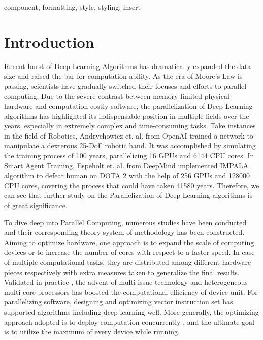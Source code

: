 \documentclass[conference]{IEEEtran}
\begin{document}
\begin{IEEEkeywords}
component, formatting, style, styling, insert
\end{IEEEkeywords}

\section{Introduction}

Recent burst of Deep Learning Algorithms has dramatically expanded the data size and raised the bar for computation ability. As the era of Moore’s Law is passing, scientists have gradually switched their focuses and efforts to parallel computing. Due to the severe contrast between memory-limited physical hardware and computation-costly software, the parallelization of Deep Learning algorithms has highlighted its indispensable position in multiple fields over the years, especially in extremely complex and time-consuming tasks. Take instances in the field of Robotics, Andrychowicz et. al. \cite{in1} from OpenAI trained a network to manipulate a dexterous 25-DoF robotic hand. It was accomplished by simulating the training process of 100 years, parallelizing 16 GPUs and 6144 CPU cores. In Smart Agent Training, Espeholt et. al. \cite{in2} from DeepMind implemented IMPALA algorithm to defeat human on DOTA 2 with the help of 256 GPUs and 128000 CPU cores, covering the process that could have taken 41580 years. Therefore, we can see that further study on the Parallelization of Deep Learning algorithms is of great significance.

To dive deep into Parallel Computing, numerous studies have been conducted and their corresponding theory system \cite{in3} of methodology has been constructed. Aiming to optimize hardware, one approach is to expand the scale of computing devices or to increase the number of cores with respect to a faster speed. In case of multiple computational tasks, they are distributed among different hardware pieces respectively with extra measures taken to generalize the final results. Validated in practice \cite{in4}, the advent of multi-issue technology and heterogeneous multi-core processors has boosted the computational efficiency of device unit. For parallelizing software, designing and optimizing vector instruction set has supported algorithms including deep learning well. More generally, the optimizing approach adopted is to deploy computation concurrently \cite{in5}, and the ultimate goal is to utilize the maximum of every device while running.
\end{document}
